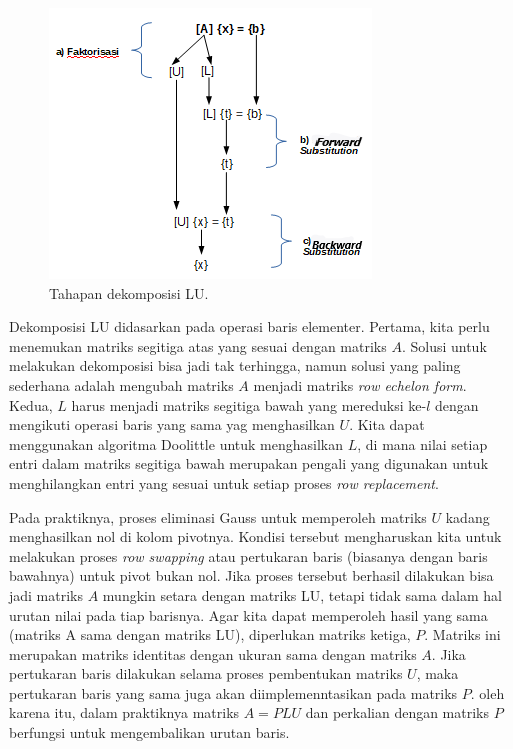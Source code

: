\documentclass[
]{book}
\theoremstyle{definition}
\theoremstyle{definition}
\theoremstyle{definition}
\theoremstyle{definition}
\theoremstyle{remark}
\begin{document}
\begin{figure}

{\centering \includegraphics[width=0.9\linewidth]{./images/LU} 

}

\caption{Tahapan dekomposisi LU.}\label{fig:LUfig}
\end{figure}

Dekomposisi LU didasarkan pada operasi baris elementer. Pertama, kita perlu menemukan matriks segitiga atas yang sesuai dengan matriks \(A\). Solusi untuk melakukan dekomposisi bisa jadi tak terhingga, namun solusi yang paling sederhana adalah mengubah matriks \(A\) menjadi matriks \emph{row echelon form}. Kedua, \(L\) harus menjadi matriks segitiga bawah yang mereduksi ke-\(l\) dengan mengikuti operasi baris yang sama yag menghasilkan \(U\). Kita dapat menggunakan algoritma Doolittle untuk menghasilkan \(L\), di mana nilai setiap entri dalam matriks segitiga bawah merupakan pengali yang digunakan untuk menghilangkan entri yang sesuai untuk setiap proses \emph{row replacement}.

Pada praktiknya, proses eliminasi Gauss untuk memperoleh matriks \(U\) kadang menghasilkan nol di kolom pivotnya. Kondisi tersebut mengharuskan kita untuk melakukan proses \emph{row swapping} atau pertukaran baris (biasanya dengan baris bawahnya) untuk pivot bukan nol. Jika proses tersebut berhasil dilakukan bisa jadi matriks \(A\) mungkin setara dengan matriks LU, tetapi tidak sama dalam hal urutan nilai pada tiap barisnya. Agar kita dapat memperoleh hasil yang sama (matriks A sama dengan matriks LU), diperlukan matriks ketiga, \(P\). Matriks ini merupakan matriks identitas dengan ukuran sama dengan matriks \(A\). Jika pertukaran baris dilakukan selama proses pembentukan matriks \(U\), maka pertukaran baris yang sama juga akan diimplemenntasikan pada matriks \(P\). oleh karena itu, dalam praktiknya matriks \(A=PLU\) dan perkalian dengan matriks \(P\) berfungsi untuk mengembalikan urutan baris.
\end{document}

